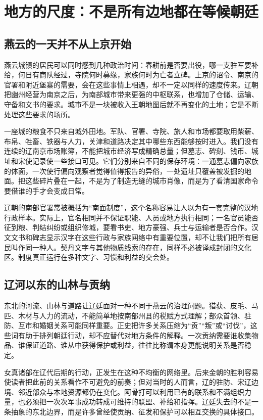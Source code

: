\section{地方的尺度：不是所有边地都在等候朝廷}

\subsection{燕云的一天并不从上京开始}

燕云城镇的居民可以同时感到几种政治时间：春耕前是否要出役，哪一支驻军要补给，何日有商队经过，寺院何时募缘，家族何时为亡者立碑。上京的诏令、南京的官署和附近堡寨的需要，会在这些事情上相遇，却不一定以同样的速度传来。辽朝把幽州经营为南京之后，为南部城市带来更强的中枢联系，也增加了仓储、运输、守备和文书的要求。城市不是一块被收入王朝地图后就不再变化的土地；它是不断处理这些要求的场所。

一座城的粮食不只来自城外田地。军队、官署、寺院、旅人和市场都要取用柴薪、布帛、牲畜、铁器与人力，关津和道路决定其中哪些东西能够按时进入。我们没有连续的辽南京市场账簿，不能把城市经济写成精确总量；但墓志、碑刻、钱币、城址和宋使记录使一些接口可见。它们分别来自不同的保存环境：一通墓志偏向家族的体面，一次使行偏向观察者觉得值得报告的异俗，一处遗址只覆盖被发掘的地面。把这些碎片叠在一起，不是为了制造无缝的城市肖像，而是为了看清国家命令要借谁的手才会变成日常。

辽朝的南部官署常被概括为“南面制度”，这个名称容易让人以为有一套完整的汉地行政样本。实际上，官名相同并不保证职能、人员或地方执行相同；一名官员能否征到粮、判结纠纷或组织修城，要看书吏、地方豪强、兵士与运输者是否合作。汉文文书和碑志显示汉字在这些行政与家族网络中有重要位置，却不让我们把所有居民叫作同一种人。契丹文字与其他物质线索的存在，同样不必被译成封闭的文化区。制度真正运行在多种文字、习惯和利益的交会处。

\subsection{辽河以东的山林与贡纳}

东北的河流、山林与道路让辽廷面对一种不同于燕云的治理问题。猎获、皮毛、马匹、木材与人力的流动，不能简单地按南部州县的税赋方式理解；部众首领、驻防、互市和婚姻关系可能同样重要。正史把许多关系压缩为“贡”“叛”或“讨伐”，这些词有助于排列朝廷行动，却不应替代对地方条件的解释。一次贡纳需要谁收集物品、谁保证道路、谁从中获得保护或利益，往往比称谓本身更能说明关系是否稳定。

女真诸部在辽代后期的行动，正发生在这种不均衡的网络里。后来金朝的胜利容易使读者把此前的关系看作不可避免的前奏；但对当时的人而言，辽的驻防、宋辽边境、邻近部众与本地资源都仍在变化。阿骨打可以利用已有的联系和不满组织力量，也必须把一次次军事成功转成可维持的联盟、补给和指挥。辽廷失去的不是一条抽象的东北边界，而是许多曾经使贡纳、征发和保护可以相互交换的具体接口。

